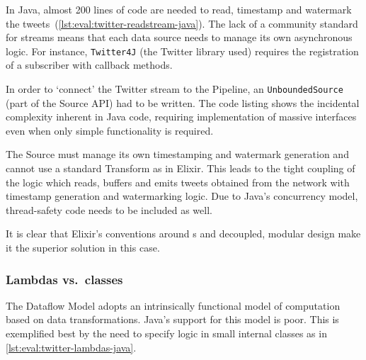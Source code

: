 In Java, almost 200 lines of code are needed to read, timestamp and watermark the tweets~(\cref{lst:eval:twitter-readstream-java}).
The lack of a community standard for streams means that each data source needs to manage its own asynchronous logic.
For instance, \texttt{Twitter4J} \cite{Twitter4J} (the Twitter library used) requires the registration of a subscriber with callback methods.

In order to `connect' the Twitter stream to the Pipeline, an \texttt{UnboundedSource} (part of the Source API) had to be written.
The code listing shows the incidental complexity inherent in Java code, requiring implementation of massive interfaces even when only simple functionality is required.

The Source must manage its own timestamping and watermark generation and cannot use a standard Transform as in Elixir.
This leads to the tight coupling of the logic which reads, buffers and emits tweets obtained from the network with timestamp generation and watermarking logic.
Due to Java's concurrency model, thread-safety code needs to be included as well.

It is clear that Elixir's conventions around s and decoupled, modular design make it the superior solution in this case.

\subsubsection{Lambdas vs.\ classes}

The Dataflow Model adopts an intrinsically functional model of computation based on data transformations.
Java's support for this model is poor.
This is exemplified best by the need to specify logic in small internal classes as in \cref{lst:eval:twitter-lambdas-java}.

